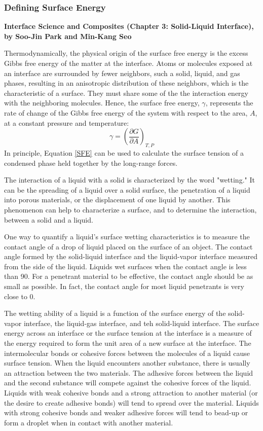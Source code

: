 \subsubsection{Defining Surface Energy}
\textbf{Interface Science and Composites (Chapter 3: Solid-Liquid Interface), by Soo-Jin Park and Min-Kang Seo\cite{Park2011a}}

Thermodynamically, the physical origin of the surface free energy is the excess Gibbs free energy of the matter at the interface. Atoms or molecules exposed at an interface are surrounded by fewer neighbors, such a solid, liquid, and gas phases, resulting in an anisotropic distribution of these neighbors, which is the characteristic of a surface. They must share some of the the interaction energy with the neighboring molecules. Hence, the surface free energy, $\gamma$, represents the rate of change of the Gibbs free energy of the system with respect to the area, $A$, at a constant pressure and temperature\cite{Chattoraj2012}:
\begin{equation}\label{SFE}
	\gamma = \left(\frac{\partial G}{\partial A}\right)_{T,P}
\end{equation}
In principle, Equation \ref{SFE} can be used to calculate the surface tension of a condensed phase held together by the long-range forces. 

The interaction of a liquid with a solid is characterized by the word "wetting." It can be the spreading of a liquid over a solid surface, the penetration of a liquid into porous materials, or the displacement of one liquid by another. This phenomenon can help to characterize a surface, and to determine the interaction, between a solid and a liquid. 

One way to quantify a liquid's surface wetting characteristics is to measure the contact angle of a drop of liquid placed on the surface of an object. The contact angle formed by the solid-liquid interface and the liquid-vapor interface measured from the side of the liquid. Liquids wet surfaces when the contact angle is less than 90\degree. For a penetrant material to be effective, the contact angle should be as small as possible. In fact, the contact angle for most liquid penetrants is very close to 0\degree. 

The wetting ability of a liquid is a function of the surface energy of the solid-vapor interface, the liquid-gas interface, and teh solid-liquid interface. The surface energy across an interface or the surface tension at the interface is a measure of the energy required to form the unit area of a new surface at the interface. The intermolecular bonds or cohesive forces between the molecules of a liquid cause surface tension. When the liquid encounters another substance, there is usually an attraction between the two materials. The adhesive forces between the liquid and the second substance will compete against the cohesive forces of the liquid. Liquids with weak cohesive bonds and a strong attraction to another material (or the desire to create adhesive bonds) will tend to spread over the material. Liquids with strong cohesive bonds and weaker adhesive forces will tend to bead-up or form a droplet when in contact with another material. 

